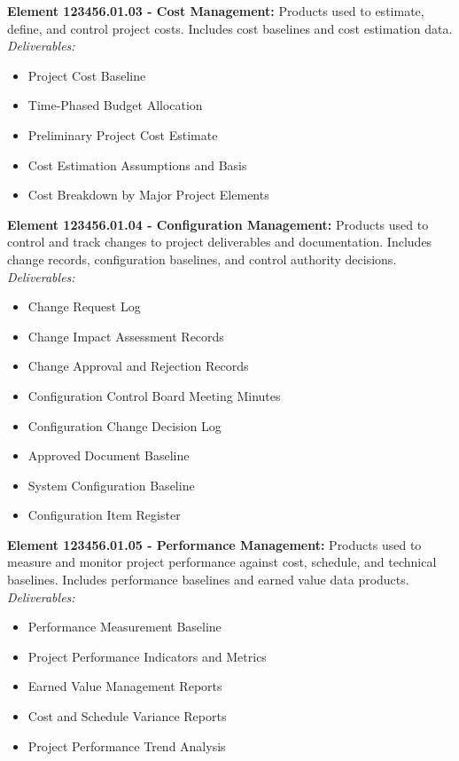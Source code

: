 \textbf{Element 123456.01.03 - Cost Management:} Products used to estimate, define, and
control project costs. Includes cost baselines and cost estimation data.\\
\textit{Deliverables:}
\begin{itemize}
    \item Project Cost Baseline
    \item Time-Phased Budget Allocation
    \item Preliminary Project Cost Estimate
    \item Cost Estimation Assumptions and Basis
    \item Cost Breakdown by Major Project Elements
\end{itemize}

\textbf{Element 123456.01.04 - Configuration Management:} Products used to control and
track changes to project deliverables and documentation. Includes change records,
configuration baselines, and control authority decisions.\\
\textit{Deliverables:}
\begin{itemize}
    \item Change Request Log
    \item Change Impact Assessment Records
    \item Change Approval and Rejection Records
    \item Configuration Control Board Meeting Minutes
    \item Configuration Change Decision Log
    \item Approved Document Baseline
    \item System Configuration Baseline
    \item Configuration Item Register
\end{itemize}

\textbf{Element 123456.01.05 - Performance Management:} Products used to measure and
monitor project performance against cost, schedule, and technical baselines.
Includes performance baselines and earned value data products.\\
\textit{Deliverables:}
\begin{itemize}
    \item Performance Measurement Baseline
    \item Project Performance Indicators and Metrics
    \item Earned Value Management Reports
    \item Cost and Schedule Variance Reports
    \item Project Performance Trend Analysis
\end{itemize}

